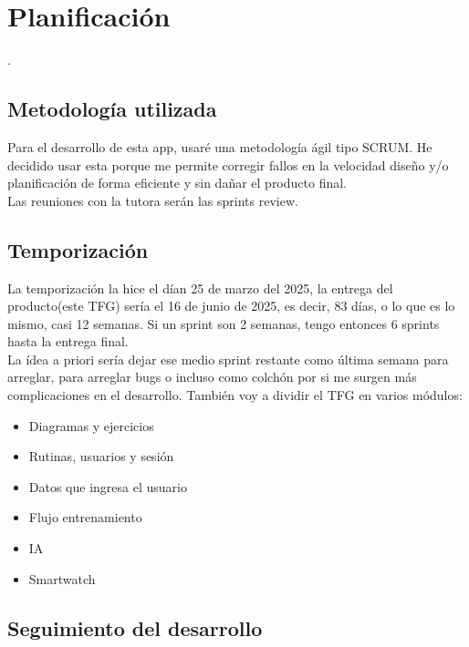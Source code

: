 \chapter{Planificación}
.
\section{Metodología utilizada}
Para el desarrollo de esta app, usaré una metodología ágil tipo SCRUM. He decidido usar esta porque me permite corregir fallos en la velocidad diseño y/o planificación de forma eficiente y sin dañar el producto final.\\

Las reuniones con la tutora serán las sprints review.
\section{Temporización}

La temporización la hice el dían 25 de marzo del 2025, la entrega del producto(este TFG) sería el 16 de junio de 2025,
es decir, 83 días, o lo que es lo mismo, casi 12 semanas. Si un sprint son 2 semanas, tengo entonces 6 sprints hasta la entrega final.\\
La ídea a priori sería dejar ese medio sprint restante como última semana para arreglar, para arreglar bugs o incluso como colchón por si me surgen más complicaciones en el desarrollo. También voy a dividir el TFG en varios módulos:
\begin{itemize}
	\item Diagramas y ejercicios
	\item Rutinas, usuarios y sesión
	\item Datos que ingresa el usuario
	\item Flujo entrenamiento
	\item IA
	\item Smartwatch
\end{itemize}

\section{Seguimiento del desarrollo}
